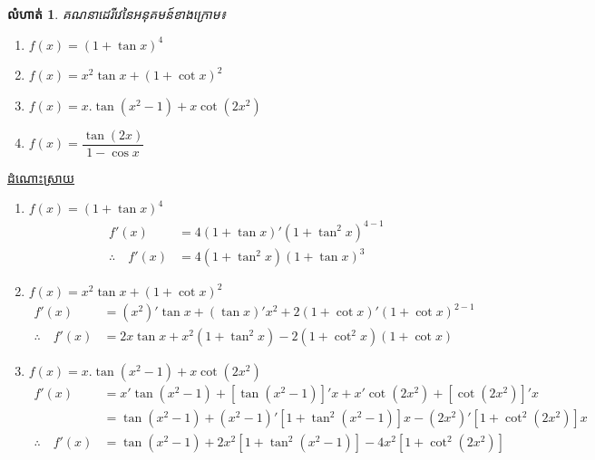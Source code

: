 \documentclass[12pt,fleqn]{book} %
\newtheorem{exercise}{\kml លំហាត់}
\newcommand{\answer}{\begin{center}
\kml \color{blue} \underline{ដំណោះស្រាយ}
\end{center}}
\begin{document}
\begin{exercise}
គណនាដេរីវេនៃអនុគមន៍ខាងក្រោម៖
\begin{multicols}{2}
\begin{enumerate}
\item $f(x)=(1+\tan x)^4$
\item $f(x)=x^2 \tan x+(1+\cot x)^2$
\item $f(x)=x.\tan (x^2-1)+x\cot (2x^2)$
\item $f(x)=\dfrac{\tan (2x)}{1-\cos x}$
\end{enumerate}
\end{multicols}
\end{exercise}

\answer 
\begin{enumerate}
\item $f(x)=(1+\tan x)^4$
\begin{align*}
f'(x)&=4(1+\tan x)'(1+\tan^2 x)^{4-1}\\
\therefore \quad f'(x)&=4(1+\tan^2 x)(1+\tan x)^3
\end{align*}
\item $f(x)=x^2 \tan x+(1+\cot x)^2$
\begin{align*}
f'(x)&=(x^2)'\tan x+(\tan x)' x^2 +2(1+\cot x)'(1+\cot x)^{2-1}\\
\therefore \quad f'(x)&= 2x\tan x+x^2(1+\tan^2 x)-2(1+\cot^2 x)(1+\cot x)
\end{align*}

\item $f(x)=x.\tan (x^2-1)+x\cot (2x^2)$
\begin{align*}
f'(x)&=x'\tan (x^2-1)+[\tan (x^2-1)]'x+x'\cot (2x^2)+[\cot (2x^2)]'x\\
&=\tan (x^2-1)+(x^2-1)'[1+\tan^2 (x^2-1)]x-(2x^2)'[1+\cot^2 (2x^2)]x\\
\therefore \quad f'(x)&=\tan (x^2-1)+2x^2 [1+\tan^2 (x^2-1)]-4x^2[1+\cot^2 (2x^2)]
\end{align*}
\end{enumerate}
\end{document}
